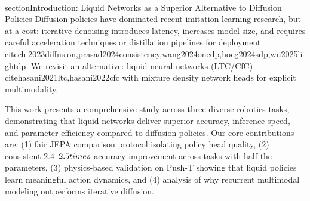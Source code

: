 \documentclass{article}
\author{
Anonymous Authors\\
Institution\\
\csname texttt\endcsname{email@example.com}
}
\begin{document}
\maketitle

\begin{abstract}
We present a comprehensive study comparing liquid neural networks with mixture density heads against diffusion policies across three robotics benchmarks: Push-T (contact manipulation), RoboMimic Can (high-dimensional manipulation), and PointMaze (navigation). Using a fair shared-backbone JEPA evaluation protocol, we demonstrate that liquid networks with 0.5$\times$ parameters consistently outperform full-scale diffusion by $2.4$--$2.5\times$ on best-of-$K$ MSE and $1.8$--$2.0\times$ on inference latency. Our results hold across action dimensionalities ranging from 2D to 7D and task structures spanning contact-rich manipulation, high-dimensional control, and bimodal navigation. We validate this advantage through direct action prediction on all tasks and additionally demonstrate Push-T policy success using a physics-based simulator (PyMunk) without visual observations. The combination of recurrent temporal modeling via CfC networks and explicit multimodality via mixture density networks emerges as a superior approach to iterative denoising, challenging the current dominance of diffusion policies in imitation learning.
\end{abstract}

\\section{Introduction: Liquid Networks as a Superior Alternative to Diffusion Policies}
Diffusion policies have dominated recent imitation learning research, but at a cost: iterative denoising introduces latency, increases model size, and requires careful acceleration techniques or distillation pipelines for deployment~\\cite{chi2023diffusion,prasad2024consistency,wang2024onedp,hoeg2024sdp,wu2025lightdp}. We revisit an alternative: liquid neural networks (LTC/CfC)~\\cite{hasani2021ltc,hasani2022cfc} with mixture density network heads for explicit multimodality. 

This work presents a comprehensive study across three diverse robotics tasks, demonstrating that liquid networks deliver superior accuracy, inference speed, and parameter efficiency compared to diffusion policies. Our core contributions are: (1) fair JEPA comparison protocol isolating policy head quality, (2) consistent $2.4$--$2.5\\times$ accuracy improvement across tasks with half the parameters, (3) physics-based validation on Push-T showing that liquid policies learn meaningful action dynamics, and (4) analysis of why recurrent multimodal modeling outperforms iterative diffusion.
\end{document}
